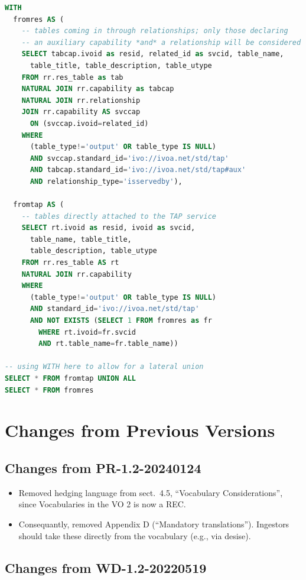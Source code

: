 \documentclass[11pt,a4paper]{ivoa}
\begin{document}
\begin{lstlisting}[basicstyle=\footnotesize,language=SQL]
WITH
  fromres AS (
    -- tables coming in through relationships; only those declaring
    -- an auxiliary capability *and* a relationship will be considered
    SELECT tabcap.ivoid as resid, related_id as svcid, table_name,
      table_title, table_description, table_utype
    FROM rr.res_table as tab
    NATURAL JOIN rr.capability as tabcap
    NATURAL JOIN rr.relationship
    JOIN rr.capability AS svccap
      ON (svccap.ivoid=related_id)
    WHERE
      (table_type!='output' OR table_type IS NULL)
      AND svccap.standard_id='ivo://ivoa.net/std/tap'
      AND tabcap.standard_id='ivo://ivoa.net/std/tap#aux'
      AND relationship_type='isservedby'),

  fromtap AS (
    -- tables directly attached to the TAP service
    SELECT rt.ivoid as resid, ivoid as svcid,
      table_name, table_title,
      table_description, table_utype
    FROM rr.res_table AS rt
    NATURAL JOIN rr.capability
    WHERE
      (table_type!='output' OR table_type IS NULL)
      AND standard_id='ivo://ivoa.net/std/tap'
      AND NOT EXISTS (SELECT 1 FROM fromres as fr
        WHERE rt.ivoid=fr.svcid
        AND rt.table_name=fr.table_name))

-- using WITH here to allow for a lateral union
SELECT * FROM fromtap UNION ALL
SELECT * FROM fromres
\end{lstlisting}


\section{Changes from Previous Versions}

\subsection{Changes from PR-1.2-20240124}

\begin{itemize}
\item Removed hedging language from sect.~4.5, ``Vocabulary
Considerations'', since Vocabularies in the VO 2 is now a REC.

\item Consequantly, removed Appendix D (``Mandatory translations'').
Ingestors should take these directly from the vocabulary (e.g., via
desise).

\end{itemize}

\subsection{Changes from WD-1.2-20220519}
\end{document}
